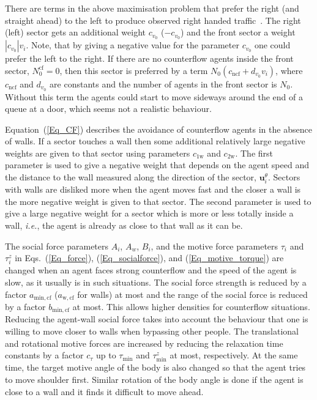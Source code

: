\documentclass[12pt,a4paper,final,twoside]{stylevk}
\begin{document}
There are terms in the above maximisation problem that prefer the
right (and straight ahead) to the left to produce observed right
handed traffic~\cite{Duisburg06}.  The right (left) sector gets an
additional weight $c_{v_0}$ ($-c_{v_0}$) and the front sector a weight
$|c_{v_0}|v_i$.  Note, that by giving a negative value for the
parameter $c_{v_0}$ one could prefer the left to the right.  If there
are no counterflow agents inside the front sector, $N^\mathrm{cf}_0 =
0$, then this sector is preferred by a term $N_0(c_\mathrm{ncf} +
d_{v_0} v_i)$, where $c_\mathrm{ncf}$ and $d_{v_0}$ are constants and
the number of agents in the front sector is $N_0$.  Without this term
the agents could start to move sideways around the end of a queue at a
door, which seems not a realistic behaviour.


Equation~(\ref{Eq_CF}) describes the avoidance of counterflow agents
in the absence of walls.  If a sector touches a wall then some
additional relatively large negative weights are given to that sector
using parameters $c_\mathrm{1w}$ and $c_\mathrm{2w}$.  The first
parameter is used to give a negative weight that depends on the agent
speed and the distance to the wall measured along the direction of the
sector, $\mathbf{u}^\theta_i$.  Sectors with walls are disliked more
when the agent moves fast and the closer a wall is the more negative
weight is given to that sector.  The second parameter is used to give
a large negative weight for a sector which is more or less totally
inside a wall, \emph{i.e.}, the agent is already as close to that wall
as it can be.


The social force parameters $A_i$, $A_w$, $B_i$, and the motive force
parameters $\tau_i$ and $\tau^z_i$ in Eqs.~(\ref{Eq_force}),
(\ref{Eq_socialforce}), and (\ref{Eq_motive_torque}) are changed when
an agent faces strong counterflow and the speed of the agent is slow,
as it usually is in such situations.  The social force strength is
reduced by a factor $a_\mathrm{min,cf}$ ($a_\mathrm{w,cf}$ for walls)
at most and the range of the social force is reduced by a factor
$b_\mathrm{min,cf}$ at most.  This allows higher densities for
counterflow situations.  Reducing the agent-wall social force takes
into account the behaviour that one is willing to move closer to walls
when bypassing other people.  The translational and rotational motive
forces are increased by reducing the relaxation time constants by a
factor $c_\tau$ up to $\tau_\mathrm{min}$ and $\tau_\mathrm{min}^z$ at
most, respectively.  At the same time, the target motive angle of the
body is also changed so that the agent tries to move shoulder first.
Similar rotation of the body angle is done if the agent is close to a
wall and it finds it difficult to move ahead.
\end{document}
